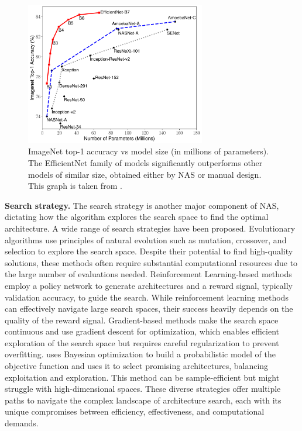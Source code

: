 \begin{figure}[htbp]
  \centering
  \includegraphics[width=0.70\textwidth]{chapter_sota/assets/efficientnet_perfs_overview.pdf}
  \caption{ImageNet top-1 accuracy vs model size (in millions of parameters).
    The EfficientNet family of models significantly outperforms other models of
    similar size, obtained either by \ac{NAS} or manual design. This graph is
    taken from \cite{DBLP:conf/icml/TanL19}.
  }
  \label{fig:sota:efficientnet_perfs}
\end{figure}


\noindent\textbf{Search strategy.} The search strategy is another major
component of \ac{NAS}, dictating how the algorithm explores the search space to
find the optimal architecture. A wide range of search strategies have been
proposed. Evolutionary algorithms \cite{DBLP:conf/icml/RealMSSSTLK17} use
principles of natural evolution such as mutation, crossover, and selection to
explore the search space. Despite their potential to find high-quality
solutions, these methods often require substantial computational resources due
to the large number of evaluations needed. Reinforcement Learning-based methods
\cite{DBLP:conf/iclr/ZophL17} employ a policy network to generate architectures
and a reward signal, typically validation accuracy, to guide the search. While
reinforcement learning methods can effectively navigate large search spaces,
their success heavily depends on the quality of the reward signal.
Gradient-based methods \cite{DBLP:conf/iclr/LiuSY19,DBLP:conf/iclr/XuX0CQ0X20}
make the search space continuous and use gradient descent for optimization,
which enables efficient exploration of the search space but requires careful
regularization to prevent overfitting. \cite{DBLP:conf/nips/BergstraBBK11} uses
Bayesian optimization to build a probabilistic model of the objective function
and uses it to select promising architectures, balancing exploitation and
exploration. This method can be sample-efficient but might struggle with
high-dimensional spaces. These diverse strategies offer multiple paths to
navigate the complex landscape of architecture search, each with its unique
compromises between efficiency, effectiveness, and computational demands.\\


